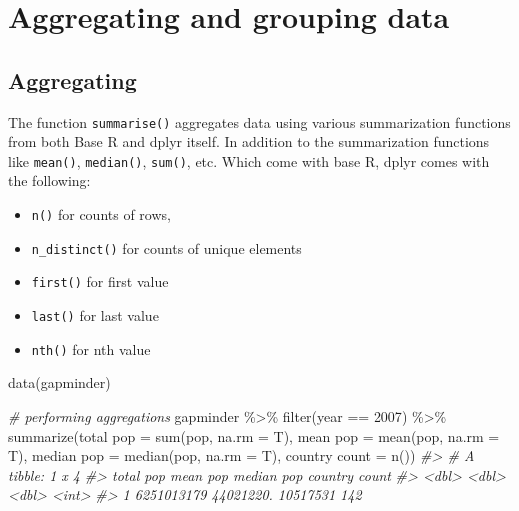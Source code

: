 \documentclass[
]{book}
\newenvironment{Shaded}{\begin{snugshade}}{\end{snugshade}}
\newcommand{\AttributeTok}[1]{\textcolor[rgb]{0.77,0.63,0.00}{#1}}
\newcommand{\CommentTok}[1]{\textcolor[rgb]{0.56,0.35,0.01}{\textit{#1}}}
\newcommand{\DecValTok}[1]{\textcolor[rgb]{0.00,0.00,0.81}{#1}}
\newcommand{\FunctionTok}[1]{\textcolor[rgb]{0.00,0.00,0.00}{#1}}
\newcommand{\NormalTok}[1]{#1}
\newcommand{\OtherTok}[1]{\textcolor[rgb]{0.56,0.35,0.01}{#1}}
\newcommand{\SpecialCharTok}[1]{\textcolor[rgb]{0.00,0.00,0.00}{#1}}
\newcommand{\StringTok}[1]{\textcolor[rgb]{0.31,0.60,0.02}{#1}}
\providecommand{\tightlist}{%
  \setlength{\itemsep}{0pt}\setlength{\parskip}{0pt}}
\begin{document}
\hypertarget{tr-summary}{%
\section{Aggregating and grouping data}\label{tr-summary}}

\hypertarget{aggregating}{%
\subsection{Aggregating}\label{aggregating}}

The function \texttt{summarise()} aggregates data using various summarization functions from both Base R and dplyr itself. In addition to the summarization functions like \texttt{mean()}, \texttt{median()}, \texttt{sum()}, etc. Which come with base R, dplyr comes with the following:

\begin{itemize}
\tightlist
\item
  \texttt{n()} for counts of rows,
\item
  \texttt{n\_distinct()} for counts of unique elements
\item
  \texttt{first()} for first value
\item
  \texttt{last()} for last value
\item
  \texttt{nth()} for nth value
\end{itemize}

\begin{Shaded}
\begin{Highlighting}[]
\FunctionTok{data}\NormalTok{(gapminder)}

\CommentTok{\# performing aggregations}
\NormalTok{gapminder }\SpecialCharTok{\%\textgreater{}\%}
  \FunctionTok{filter}\NormalTok{(year }\SpecialCharTok{==} \DecValTok{2007}\NormalTok{) }\SpecialCharTok{\%\textgreater{}\%}
  \FunctionTok{summarize}\NormalTok{(}\StringTok{\textasciigrave{}}\AttributeTok{total pop}\StringTok{\textasciigrave{}} \OtherTok{=} \FunctionTok{sum}\NormalTok{(pop, }\AttributeTok{na.rm =}\NormalTok{ T), }
            \StringTok{\textasciigrave{}}\AttributeTok{mean pop}\StringTok{\textasciigrave{}} \OtherTok{=} \FunctionTok{mean}\NormalTok{(pop, }\AttributeTok{na.rm =}\NormalTok{ T), }
            \StringTok{\textasciigrave{}}\AttributeTok{median pop}\StringTok{\textasciigrave{}} \OtherTok{=} \FunctionTok{median}\NormalTok{(pop, }\AttributeTok{na.rm =}\NormalTok{ T), }
            \StringTok{\textasciigrave{}}\AttributeTok{country count}\StringTok{\textasciigrave{}} \OtherTok{=} \FunctionTok{n}\NormalTok{())}
\CommentTok{\#\textgreater{} \# A tibble: 1 x 4}
\CommentTok{\#\textgreater{}   \textasciigrave{}total pop\textasciigrave{} \textasciigrave{}mean pop\textasciigrave{} \textasciigrave{}median pop\textasciigrave{} \textasciigrave{}country count\textasciigrave{}}
\CommentTok{\#\textgreater{}         \textless{}dbl\textgreater{}      \textless{}dbl\textgreater{}        \textless{}dbl\textgreater{}           \textless{}int\textgreater{}}
\CommentTok{\#\textgreater{} 1  6251013179  44021220.     10517531             142}
\end{Highlighting}
\end{Shaded}
\end{document}
